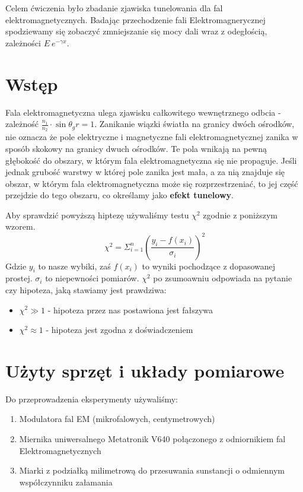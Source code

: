 \documentclass[a4paper,12pt]{article}
\begin{document}
Celem ćwiczenia było zbadanie zjawiska tunelowania dla fal elektromagnetycznych. Badając przechodzenie fali Elektromagnerycznej spodziewamy się zobaczyć zmniejszanie się mocy dali wraz z odegłością, zależności $E~e^{-\gamma x}$. 

\section{Wstęp}

Fala elektromagnetyczna ulega zjawisku całkowitego wewnętrznego odbcia - zależność $\frac{n_1}{n_2}\cdot \sin \theta_gr = 1 $. Zanikanie wiązki światła na granicy dwóch ośrodków, nie oznacza że pole elektryczne i magnetyczne fali elektromagnetycznej zanika w sposób skokowy na granicy dwuch ośrodków. Te pola wnikają na pewną głębokość do obszary, w którym fala elektromagnetyczna się nie propaguje. 
Jeśli jednak grubość warstwy w której pole zanika jest mała, a za nią znajduje się obszar, w którym fala elektromagnetyczna może się rozprzestrzeniać, to jej część przejdzie do tego obszaru, co określamy jako \textbf{efekt tunelowy}.



Aby sprawdzić powyższą hiptezę używaliśmy testu $\chi^2$ zgodnie z poniższym wzorem. 
$$
\chi^2 = \Sigma_{i=1}^n {\left( \frac{y_i - f(x_i)}{\sigma_i} \right)}^2
$$
Gdzie $y_i$ to nasze wybiki, zaś $f(x_i)$ to wyniki pochodzące z dopasowanej prostej. $\sigma_i$ to niepewności pomiarów. 
$\chi^2$ po zsumoawniu odpowiada na pytanie czy hipoteza, jaką stawiamy jest prawdziwa: 
\begin{itemize}
  \item $\chi^2 \gg 1$ - hipoteza przez nas postawiona jest fałszywa 
  \item $\chi^2 \approx 1$ - hipoteza jest zgodna z doświadczeniem
\end{itemize}




\section{Użyty sprzęt i układy pomiarowe}

Do przeprowadzenia eksperymenty używaliśmy: 

\begin{enumerate}
  \item Modulatora fal EM (mikrofalowych, centymetrowych) 
  \item Miernika uniwersalnego Metatronik V640 połączonego z odniornikiem fal Elektromagnetycznych
  \item Miarki z podziałką milimetrową do przesuwania sunstancji o odmiennym współczynniku załamania
  
\end{enumerate}
\end{document}
